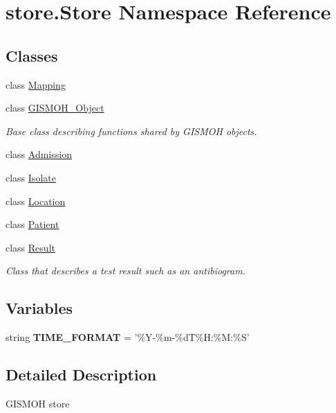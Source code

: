 \hypertarget{namespacestore_1_1_store}{\section{store.\-Store Namespace Reference}
\label{namespacestore_1_1_store}
}
\subsection*{Classes}
\begin{DoxyCompactItemize}
\item 
class \hyperlink{classstore_1_1_store_1_1_mapping}{Mapping}
\item 
class \hyperlink{classstore_1_1_store_1_1_g_i_s_m_o_h___object}{G\-I\-S\-M\-O\-H\-\_\-\-Object}
\begin{DoxyCompactList}\small\item\em Base class describing functions shared by G\-I\-S\-M\-O\-H objects. \end{DoxyCompactList}\item 
class \hyperlink{classstore_1_1_store_1_1_admission}{Admission}
\item 
class \hyperlink{classstore_1_1_store_1_1_isolate}{Isolate}
\item 
class \hyperlink{classstore_1_1_store_1_1_location}{Location}
\item 
class \hyperlink{classstore_1_1_store_1_1_patient}{Patient}
\item 
class \hyperlink{classstore_1_1_store_1_1_result}{Result}
\begin{DoxyCompactList}\small\item\em Class that describes a test result such as an antibiogram. \end{DoxyCompactList}\end{DoxyCompactItemize}
\subsection*{Variables}
\begin{DoxyCompactItemize}
\item 
\hypertarget{namespacestore_1_1_store_a53fdf27dcda71b32ea63bd7da67fd879}{string {\bfseries T\-I\-M\-E\-\_\-\-F\-O\-R\-M\-A\-T} = '\%Y-\/\%m-\/\%d\-T\%H\-:\%M\-:\%S'}\label{namespacestore_1_1_store_a53fdf27dcda71b32ea63bd7da67fd879}

\end{DoxyCompactItemize}


\subsection{Detailed Description}
\begin{DoxyVerb}GISMOH store
\end{DoxyVerb}
 